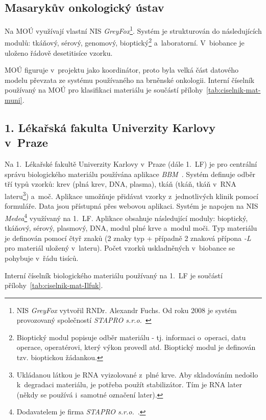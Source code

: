 \documentclass[11pt, draft, oneside]{fithesis2}
\begin{document}
\subsection{Masarykův onkologický ústav}
Na MOÚ využívají vlastní NIS \textit{GreyFox}\footnote{NIS \textit{GreyFox} vytvořil RNDr. Alexandr Fuchs. Od roku 2008 je systém provozovaný společností \textit{STAPRO s.r.o.}~\cite{GreyFox}}. Systém je strukturován do následujících modulů: tkáňový, sérový, genomový, bioptický\footnote{Bioptický modul popisuje odběr materiálu - tj. informaci o~operaci, datu operace, operatérovi, který výkon provedl atd. Bioptický modul je definován tzv. bioptickou žádankou.} a~laboratorní. V~biobance je uloženo řádově desetitisíce vzorku.

MOÚ figuruje v~projektu jako koordinátor, proto byla velká část datového modelu převzata ze systému používaného na brněnské onkologii. Interní číselník používaný na MOÚ pro klasifikaci materiálu je součástí přílohy~\ref{tab:ciselnik-mat-muni}.

\subsection{1. Lékařská fakulta Univerzity Karlovy v~Praze}

Na 1.~Lékařské fakultě Univerzity Karlovy v~Praze (dále 1.~LF) je pro centrální správu biologického materiálu používána aplikace \textit{BBM}~\cite{1LF_BBM}. Systém definuje odběr tří typů vzorků: krev (plná krev, DNA, plasma), tkáň (tkáň, tkáň v~RNA lateru\footnote{Ukládanou látkou je RNA vyizolované z~plné krve. Aby skladováním nedošlo k~degradaci materiálu, je potřeba použít stabilizátor. Tím je RNA later (někdy se používá i~samotné označení later).}) a~moč. Aplikace umožňuje přidávat vzorky z~jednotlivých klinik pomocí formuláře. Data jsou přístupná přes webovou aplikaci.
Systém je napojen na NIS \textit{Medea}\footnote{Dodavatelem je firma \textit{STAPRO s.r.o.}~\cite{Medea}.} využívaný na 1.~LF. 
Aplikace obsahuje následující moduly:  bioptický, tkáňový, sérový, plasmový, DNA, modul plné krve a~modul moči.
Typ materiálu je definován pomocí čtyř znaků (2 znaky typ + případně 2 znaková přípona \textit{-L} pro materiál uložený v~lateru). Počet vzorků uskladněných v~biobance se pohybuje v~řádu tisíců.

Interní číselník biologického materiálu používaný na 1.~LF je součástí přílohy~\ref{tab:ciselnik-mat-Ilfuk}.
\end{document}
